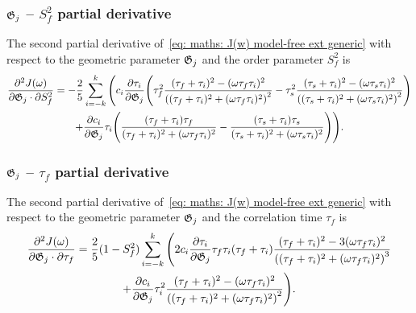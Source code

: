 \subsubsection{$\mathfrak{G}_j$ -- $S^2_f$ partial derivative}

The second partial derivative of~\eqref{eq: maths: J(w) model-free ext generic} with respect to the geometric parameter $\mathfrak{G}_j$ and the order parameter $S^2_f$ is
\begin{multline}
    \frac{\partial^2 J(\omega)}{\partial \mathfrak{G}_j \cdot \partial S^2_f} = -\frac{2}{5} \sum_{i=-k}^k \Bigg(
        c_i \frac{\partial \tau_i}{\partial \mathfrak{G}_j} \Bigg(
            \tau_f^2 \frac{(\tau_f + \tau_i)^2 - (\omega \tau_f \tau_i)^2}{\left((\tau_f + \tau_i)^2 + (\omega \tau_f \tau_i)^2 \right)^2}
            - \tau_s^2 \frac{(\tau_s + \tau_i)^2 - (\omega \tau_s \tau_i)^2}{\left((\tau_s + \tau_i)^2 + (\omega \tau_s \tau_i)^2 \right)^2}
        \Bigg) \\
        +  \frac{\partial c_i}{\partial \mathfrak{G}_j} \tau_i \Bigg(
            \frac{(\tau_f + \tau_i)\tau_f}{(\tau_f + \tau_i)^2 + (\omega \tau_f \tau_i)^2}
            - \frac{(\tau_s + \tau_i)\tau_s}{(\tau_s + \tau_i)^2 + (\omega \tau_s \tau_i)^2}
        \Bigg)
    \Bigg).
\end{multline}



\subsubsection{$\mathfrak{G}_j$ -- $\tau_f$ partial derivative}

The second partial derivative of~\eqref{eq: maths: J(w) model-free ext generic} with respect to the geometric parameter $\mathfrak{G}_j$ and the correlation time $\tau_f$ is
\begin{multline}
    \frac{\partial^2 J(\omega)}{\partial \mathfrak{G}_j \cdot \partial \tau_f} = \frac{2}{5} (1 - S^2_f) \sum_{i=-k}^k \Bigg(
        2 c_i \frac{\partial \tau_i}{\partial \mathfrak{G}_j} \tau_f \tau_i (\tau_f + \tau_i)
            \frac{(\tau_f + \tau_i)^2 - 3(\omega \tau_f \tau_i)^2}{\left((\tau_f + \tau_i)^2 + (\omega \tau_f \tau_i)^2 \right)^3}  \\
        + \frac{\partial c_i}{\partial \mathfrak{G}_j} \tau_i^2 \frac{(\tau_f + \tau_i)^2 - (\omega \tau_f \tau_i)^2}{\left((\tau_f + \tau_i)^2 + (\omega \tau_f \tau_i)^2 \right)^2}
    \Bigg).
\end{multline}



